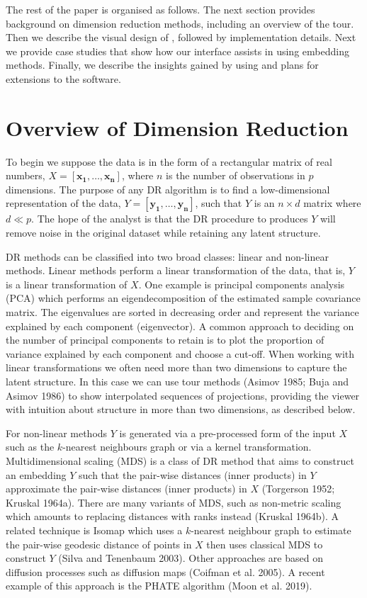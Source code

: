 \documentclass[article,notitle]{jdssv}
\begin{document}
The rest of the paper is organised as follows. The next section provides
background on dimension reduction methods, including an overview of the tour.
Then we describe the visual design of , followed by implementation
details. Next we provide case studies that show how our interface assists
in using embedding methods. Finally, we describe the insights gained by using
 and plans for extensions to the software.

\hypertarget{overview-of-dimension-reduction}{%
\section{Overview of Dimension Reduction}\label{overview-of-dimension-reduction}}

To begin we suppose the data is in the form of a rectangular
matrix of real numbers, \(X = [\mathbf{x_1}, \dots, \mathbf{x_n}]\), where \(n\) is
the number of observations in \(p\) dimensions. The purpose of any DR algorithm
is to find a low-dimensional representation of the data,
\(Y = [\mathbf{y_1}, \dots, \mathbf{y_n}]\), such that \(Y\) is an \(n \times d\)
matrix where \(d \ll p\). The hope of the analyst is that the DR procedure to
produces \(Y\) will remove noise in the original dataset while retaining any
latent structure.

DR methods can be classified into two broad classes: linear and non-linear
methods. Linear methods perform a linear transformation of the data, that is,
\(Y\) is a linear transformation of \(X\). One example is principal components
analysis (PCA) which performs an eigendecomposition of the estimated sample
covariance matrix. The eigenvalues are sorted in decreasing order and represent
the variance explained by each component (eigenvector).
A common approach to deciding on the number of principal components to retain is
to plot the proportion of variance explained by each component and choose a
cut-off.
When working with linear transformations we often need more than two dimensions
to capture the latent structure. In this case we can use tour methods
(Asimov 1985; Buja and Asimov 1986) to show interpolated sequences of projections,
providing the viewer with intuition about structure in more than two
dimensions, as described below.

For non-linear methods \(Y\) is generated via a pre-processed form of the input
\(X\) such as the \(k\)-nearest neighbours graph or via a kernel transformation.
Multidimensional scaling (MDS) is a class of DR method that aims to construct
an embedding \(Y\) such that the pair-wise distances (inner products) in \(Y\)
approximate the pair-wise distances (inner products) in \(X\)
(Torgerson 1952; Kruskal 1964a). There are many
variants of MDS, such as non-metric scaling which amounts to replacing
distances with ranks instead (Kruskal 1964b).
A related technique is Isomap which uses a \(k\)-nearest neighbour graph
to estimate the pair-wise geodesic distance of points in \(X\) then uses classical
MDS to construct \(Y\) (Silva and Tenenbaum 2003). Other approaches are based on diffusion
processes such as diffusion maps (Coifman et al. 2005). A recent example of this
approach is the PHATE algorithm (Moon et al. 2019).
\end{document}
